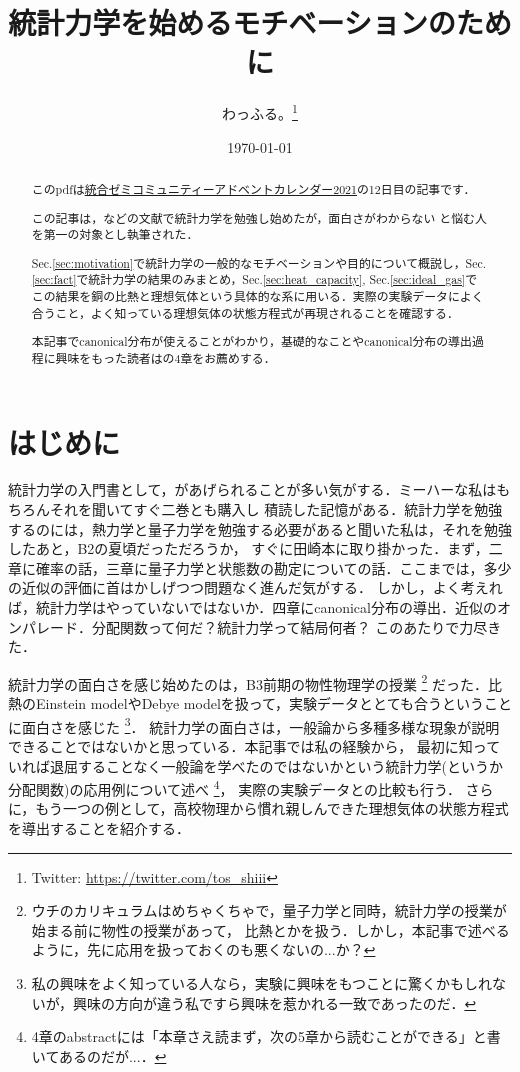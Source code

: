 \documentclass[dvipdfmx, a4paper]{jsarticle}
\title{統計力学を始めるモチベーションのために}
\author{わっふる。\footnote{Twitter: \url{https://twitter.com/tos_shiii}}}
\date{\today}
\theoremstyle{break}
\numberwithin{equation}{section}
\begin{document}
\maketitle

\begin{abstract}
    このpdfは\href{https://adventar.org/calendars/6268}{統合ゼミコミュニティーアドベントカレンダー2021}の12日目の記事です．
    
    この記事は，\cite{Tasaki_statmech}などの文献で統計力学を勉強し始めたが，面白さがわからない
    と悩む人を第一の対象とし執筆された．
	
	Sec.\ref{sec:motivation}で統計力学の一般的なモチベーションや目的について概説し，Sec.\ref{sec:fact}で統計力学の結果のみまとめ，Sec.\ref{sec:heat_capacity}, Sec.\ref{sec:ideal_gas}でこの結果を銅の比熱と理想気体という具体的な系に用いる．実際の実験データによく合うこと，よく知っている理想気体の状態方程式が再現されることを確認する．

	本記事でcanonical分布が使えることがわかり，基礎的なことやcanonical分布の導出過程に興味をもった読者は\cite{Tasaki_statmech}の4章をお薦めする．
\end{abstract}
\section{はじめに}
    統計力学の入門書として，\cite{Tasaki_statmech}があげられることが多い気がする．ミーハーな私はもちろんそれを聞いてすぐ二巻とも購入し
    積読した記憶がある．統計力学を勉強するのには，熱力学と量子力学を勉強する必要があると聞いた私は，それを勉強したあと，B2の夏頃だっただろうか，
    すぐに田崎本に取り掛かった．まず，二章に確率の話，三章に量子力学と状態数の勘定についての話．ここまでは，多少の近似の評価に首はかしげつつ問題なく進んだ気がする．
    しかし，よく考えれば，統計力学はやっていないではないか．四章にcanonical分布の導出．近似のオンパレード．分配関数って何だ？統計力学って結局何者？
    このあたりで力尽きた．

    統計力学の面白さを感じ始めたのは，B3前期の物性物理学の授業
    \footnote{ウチのカリキュラムはめちゃくちゃで，量子力学と同時，統計力学の授業が始まる前に物性の授業があって，
    比熱とかを扱う．しかし，本記事で述べるように，先に応用を扱っておくのも悪くないの...か？}
    だった．比熱のEinstein modelやDebye modelを扱って，実験データととても合うということに面白さを感じた
	\footnote{
			私の興味をよく知っている人なら，実験に興味をもつことに驚くかもしれないが，興味の方向が違う私ですら興味を惹かれる一致であったのだ．
	}．
    統計力学の面白さは，一般論から多種多様な現象が説明できることではないかと思っている．本記事では私の経験から，
    最初に知っていれば退屈することなく一般論を学べたのではないかという統計力学(というか分配関数)の応用例について述べ
	\footnote{
			\cite{Tasaki_statmech}4章のabstractには「本章さえ読まず，次の5章から読むことができる」と書いてあるのだが...．
	}，
    実際の実験データ\cite{doi:10.1063/1.555728}との比較も行う．
	さらに，もう一つの例として，高校物理から慣れ親しんできた理想気体の状態方程式を導出することを紹介する．
\end{document}
